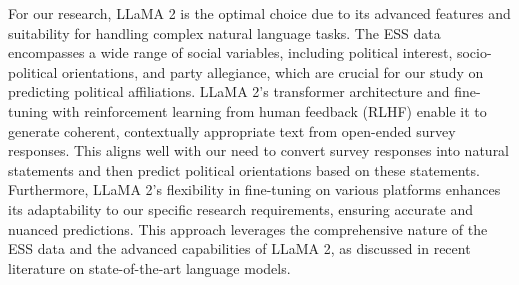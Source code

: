 For our research, LLaMA 2 is the optimal choice due to its advanced features and suitability for handling complex natural language tasks. The ESS data encompasses a wide range of social variables, including political interest, socio-political orientations, and party allegiance, which are crucial for our study on predicting political affiliations. LLaMA 2's transformer architecture and fine-tuning with reinforcement learning from human feedback (RLHF) enable it to generate coherent, contextually appropriate text from open-ended survey responses. This aligns well with our need to convert survey responses into natural statements and then predict political orientations based on these statements. Furthermore, LLaMA 2's flexibility in fine-tuning on various platforms enhances its adaptability to our specific research requirements, ensuring accurate and nuanced predictions. This approach leverages the comprehensive nature of the ESS data and the advanced capabilities of LLaMA 2, as discussed in recent literature on state-of-the-art language models.

